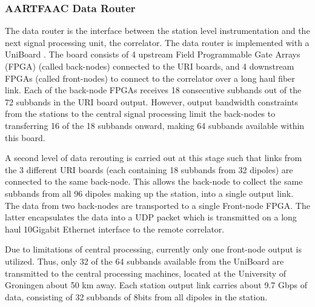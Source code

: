 \documentclass{ws-jai}
\begin{document}
\subsubsection {\label {sec:afaac_unb} AARTFAAC  Data Router}
The data router  is the interface between the station  level instrumentation and
the next signal processing unit, the correlator.  The data router is implemented
with a UniBoard \citep{gunst2014application}.  The  board consists of 4 upstream
Field Programmable Gate  Arrays (FPGA) (called back-nodes) connected  to the URI
boards, and 4 downstream FPGAs (called front-nodes) to connect to the correlator
over  a  long  haul  fiber  link.   Each of  the  back-node  FPGAs  receives  18
consecutive subbands out  of the 72 subbands in the  URI board output.  However,
output bandwidth constraints from the  stations to the central signal processing
limit the  back-nodes to transferring  16 of the  18 subbands onward,  making 64
subbands available within this board.

A second level  of data rerouting is  carried out at this stage  such that links
from the  3 different URI boards  (each containing 18 subbands  from 32 dipoles)
are connected to  the same back-node.  This allows the  back-node to collect the
same subbands from  all 96 dipoles making  up the station, into  a single output
link.  The data from two back-nodes are transported to a single Front-node FPGA.
The latter  encapsulates the data  into a UDP packet  which is transmitted  on a
long  haul 10Gigabit  Ethernet interface  to  the remote  correlator.  

Due to limitations  of central processing, currently only  one front-node output
is utilized. Thus,  only 32 of the  64 subbands available from  the UniBoard are
transmitted to  the central  processing machines, located  at the  University of
Groningen about 50 km  away.  Each station output link carries  about 9.7 Gbps of
data, consisting of 32 subbands of 8bits from all dipoles in the station.\\

\end{document}
